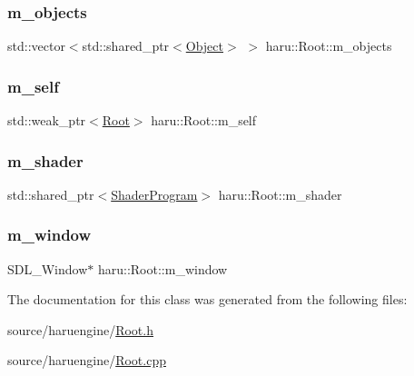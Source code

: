 \subsubsection{\texorpdfstring{m\+\_\+objects}{m\_objects}}
{\footnotesize\ttfamily std\+::vector$<$std\+::shared\+\_\+ptr$<$\mbox{\hyperlink{classharu_1_1_object}{Object}}$>$ $>$ haru\+::\+Root\+::m\+\_\+objects\hspace{0.3cm}{\ttfamily [private]}}

\mbox{\label{classharu_1_1_root_a36ccda976146da69253d0de01641dbec}} 
\subsubsection{\texorpdfstring{m\+\_\+self}{m\_self}}
{\footnotesize\ttfamily std\+::weak\+\_\+ptr$<$\mbox{\hyperlink{classharu_1_1_root}{Root}}$>$ haru\+::\+Root\+::m\+\_\+self\hspace{0.3cm}{\ttfamily [private]}}

\mbox{\label{classharu_1_1_root_af62f9d3dc17742091234295bd4c6bac4}} 
\subsubsection{\texorpdfstring{m\+\_\+shader}{m\_shader}}
{\footnotesize\ttfamily std\+::shared\+\_\+ptr$<$\mbox{\hyperlink{classharu_1_1_shader_program}{Shader\+Program}}$>$ haru\+::\+Root\+::m\+\_\+shader\hspace{0.3cm}{\ttfamily [private]}}

\mbox{\label{classharu_1_1_root_a91725127201f71d5a1f2aebfafac499c}} 
\subsubsection{\texorpdfstring{m\+\_\+window}{m\_window}}
{\footnotesize\ttfamily S\+D\+L\+\_\+\+Window$\ast$ haru\+::\+Root\+::m\+\_\+window\hspace{0.3cm}{\ttfamily [private]}}



The documentation for this class was generated from the following files\+:\begin{DoxyCompactItemize}
\item 
source/haruengine/\mbox{\hyperlink{_root_8h}{Root.\+h}}\item 
source/haruengine/\mbox{\hyperlink{_root_8cpp}{Root.\+cpp}}\end{DoxyCompactItemize}
